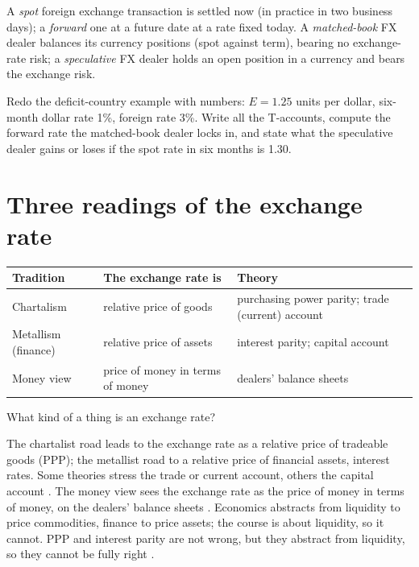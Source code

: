 \begin{paracol}{2}
\begin{definition}
A \emph{spot} foreign exchange transaction is settled now (in practice in two business days); a \emph{forward} one at a future date at a rate fixed today. A
\emph{matched-book} FX dealer balances its currency positions (spot against term), bearing no exchange-rate risk; a \emph{speculative} FX dealer holds an open position in a
currency and bears the exchange risk.
\end{definition}

\begin{exercise}
Redo the deficit-country example with numbers: $E=1.25$ units per dollar, six-month dollar rate 1\%, foreign rate 3\%. Write all the T-accounts, compute the forward rate the matched-book
dealer locks in, and state what the speculative dealer gains or loses if the spot rate in six months is 1.30.
\end{exercise}

\section{Three readings of the exchange rate}\label{sec:cm-compared}

\begin{nfigure}
\renewcommand{\arraystretch}{1.35}
\begin{tabularx}{\linewidth}{l|L|L}
\textbf{Tradition} & \textbf{The exchange rate is} & \textbf{Theory}\\\hline
Chartalism & relative price of goods & purchasing power parity; trade (current) account\\
Metallism (finance) & relative price of assets & interest parity; capital account\\
Money view & price of money in terms of money & dealers' balance sheets\\
\end{tabularx}
\caption{What kind of a thing is an exchange rate? }\label{fig:cm-three}
\end{nfigure}

The chartalist road leads to the exchange rate as a relative price of tradeable goods (PPP); the metallist road to a relative price of financial assets, interest rates. Some theories
stress the trade or current account, others the capital account . The money view sees the exchange rate as the price of money in terms of
money, on the dealers' balance sheets . Economics abstracts from liquidity to price commodities, finance to price assets; the course is about liquidity, so it cannot.
PPP and interest parity are not wrong, but they abstract from liquidity, so they cannot be fully right .


\end{paracol}
